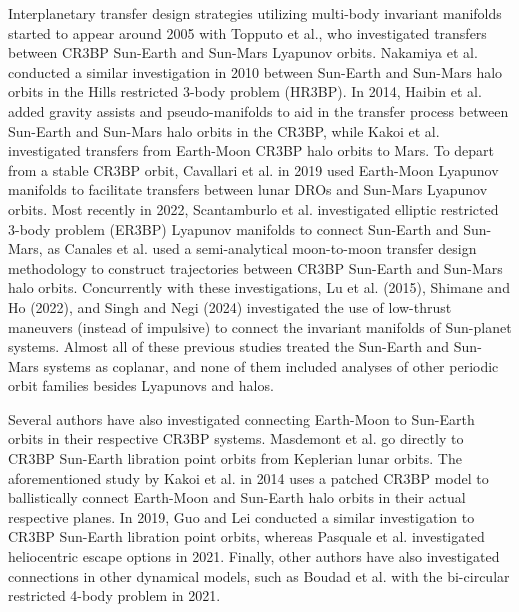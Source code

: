 Interplanetary transfer design strategies utilizing multi-body invariant manifolds started to
appear around 2005 with Topputo et al., who investigated transfers between CR3BP Sun-Earth and
Sun-Mars Lyapunov orbits\cite{Topputo:2005}. Nakamiya et al. conducted a similar investigation in
2010 between Sun-Earth and Sun-Mars halo orbits in the Hills restricted 3-body problem
(HR3BP)\cite{Nakamiya:2010}. In 2014, Haibin et al. added gravity assists and pseudo-manifolds to
aid in the transfer process between Sun-Earth and Sun-Mars halo orbits in the
CR3BP\cite{Haibin:2014}, while Kakoi et al. investigated transfers from Earth-Moon CR3BP halo
orbits to Mars\cite{Kakoi:2014}. To depart from a stable CR3BP orbit, Cavallari et al. in 2019 used
Earth-Moon Lyapunov manifolds to facilitate transfers between lunar DROs and Sun-Mars Lyapunov
orbits\cite{Cavallari:2019}. Most recently in 2022, Scantamburlo et al. investigated elliptic
restricted 3-body problem (ER3BP) Lyapunov manifolds to connect Sun-Earth and
Sun-Mars\cite{Scantamburlo:2022}, as Canales et al. used a semi-analytical moon-to-moon transfer
design methodology to construct trajectories between CR3BP Sun-Earth and Sun-Mars halo
orbits\cite{Canales:2021a,Canales:2022}. Concurrently with these investigations, Lu et al. (2015)\cite{Lu:2015},
Shimane and Ho (2022)\cite{Shimane:2022}, and Singh and Negi (2024)\cite{Singh:2024} investigated
the use of low-thrust maneuvers (instead of impulsive) to connect the invariant manifolds of
Sun-planet systems\cite{Lu:2015,Shimane:2022}. Almost all of these previous studies treated the
Sun-Earth and Sun-Mars systems as coplanar, and none of them included analyses of other periodic
orbit families besides Lyapunovs and halos.

Several authors have also investigated connecting Earth-Moon to Sun-Earth orbits in their
respective CR3BP systems. Masdemont et al. go directly to CR3BP Sun-Earth libration point orbits
from Keplerian lunar orbits\cite{Masdemont:2021}. The aforementioned study by Kakoi et al. in 2014
uses a patched CR3BP model to ballistically connect Earth-Moon and Sun-Earth halo orbits in their
actual respective planes\cite{Kakoi:2014}. In 2019, Guo and Lei conducted a similar investigation
to CR3BP Sun-Earth libration point orbits\cite{Guo:2019}, whereas Pasquale et al. investigated
heliocentric escape options in 2021\cite{Pasquale:2021}. Finally, other authors have also
investigated connections in other dynamical models, such as Boudad et al. with the bi-circular
restricted 4-body problem in 2021\cite{Boudad:2021}.

